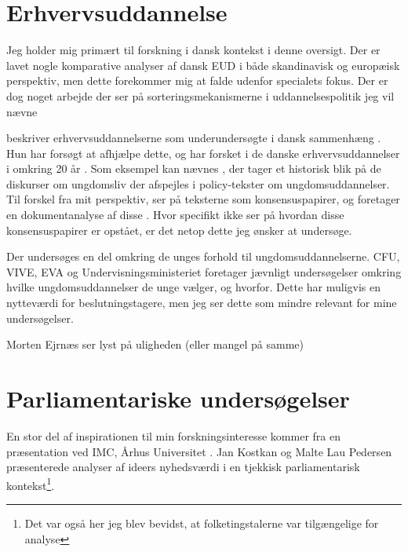 \section{Erhvervsuddannelse}
Jeg holder mig primært til forskning i dansk kontekst i denne oversigt.
Der er lavet nogle komparative analyser af dansk EUD i både skandinavisk og europæisk perspektiv, men dette forekommer mig at falde udenfor specialets fokus.
Der er dog noget arbejde der ser på sorteringsmekanismerne i uddannelsespolitik jeg vil nævne


\citeauthor{juulErhvervsuddannelserneForsomtForskningsomrade2004} beskriver erhvervsuddannelserne som underundersøgte i dansk sammenhæng \autocite{juulErhvervsuddannelserneForsomtForskningsomrade2004}.
Hun har forsøgt at afhjælpe dette, og har forsket i de danske erhvervsuddannelser i omkring 20 år \autocite{IdaJuulPublikationer}.
Som eksempel kan nævnes , der tager et historisk blik på de diskurser om ungdomsliv der afspejles i policy-tekster om ungdomsuddannelser.
Til forskel fra mit perspektiv, ser \citeauthor{juulDiskurserOmUngdom2013} på teksterne som konsensuspapirer, og foretager en dokumentanalyse af disse \autocite{juulDiskurserOmUngdom2013}.
Hvor \citeauthor{juulDiskurserOmUngdom2013} specifikt ikke ser på hvordan disse konsensuspapirer er opstået, er det netop dette jeg ønsker at undersøge.

Der undersøges en del omkring de unges forhold til ungdomsuddannelserne. CFU, VIVE, EVA og Undervisningsministeriet foretager jævnligt undersøgelser omkring hvilke ungdomsuddannelser de unge vælger, og hvorfor.
Dette har muligvis en nytteværdi for beslutningstagere, men jeg ser dette som mindre relevant for mine undersøgelser.

Morten Ejrnæs ser lyst på uligheden (eller mangel på samme)

\section{Parliamentariske undersøgelser}\label{sec:review-parl}

En stor del af inspirationen til min forskningsinteresse kommer fra en præsentation ved IMC, Århus Universitet \autocite{interactingmindscentreaarhusuniversityNLPWorkshopIMC2019}. Jan Kostkan og Malte Lau Pedersen præsenterede analyser af ideers nyhedsværdi i en tjekkisk parliamentarisk kontekst\footnote{Det var også her jeg blev bevidst, at folketingstalerne var tilgængelige for analyse}.

